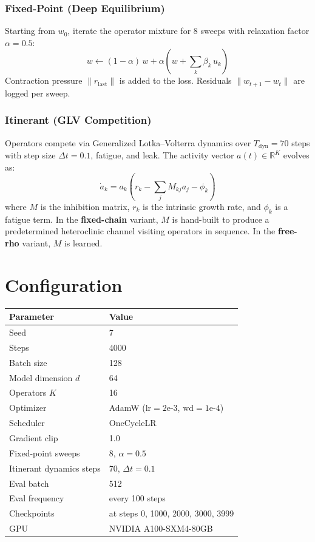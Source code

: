 \documentclass[11pt]{article}
\begin{document}
\subsubsection*{Fixed-Point (Deep Equilibrium)}
Starting from $w_0$, iterate the operator mixture for 8 sweeps with relaxation factor $\alpha = 0.5$:
\[
w \leftarrow (1 - \alpha) \, w + \alpha \left(w + \sum_k \beta_k \, u_k\right)
\]
Contraction pressure $\|r_{\text{last}}\|$ is added to the loss. Residuals $\|w_{t+1} - w_t\|$ are logged per sweep.

\subsubsection*{Itinerant (GLV Competition)}
Operators compete via Generalized Lotka--Volterra dynamics over $T_{\text{dyn}} = 70$ steps with step size $\Delta t = 0.1$, fatigue, and leak. The activity vector $a(t) \in \mathbb{R}^K$ evolves as:
\[
\dot{a}_k = a_k \left(r_k - \sum_j M_{kj} a_j - \phi_k\right)
\]
where $M$ is the inhibition matrix, $r_k$ is the intrinsic growth rate, and $\phi_k$ is a fatigue term. In the \textbf{fixed-chain} variant, $M$ is hand-built to produce a predetermined heteroclinic channel visiting operators in sequence. In the \textbf{free-rho} variant, $M$ is learned.

\section{Configuration}

\begin{table}[H]
\centering
\begin{tabular}{ll}
\toprule
\textbf{Parameter} & \textbf{Value} \\
\midrule
Seed & 7 \\
Steps & 4000 \\
Batch size & 128 \\
Model dimension $d$ & 64 \\
Operators $K$ & 16 \\
Optimizer & AdamW ($\text{lr}=2\text{e-}3$, $\text{wd}=1\text{e-}4$) \\
Scheduler & OneCycleLR \\
Gradient clip & 1.0 \\
Fixed-point sweeps & 8, $\alpha=0.5$ \\
Itinerant dynamics steps & 70, $\Delta t=0.1$ \\
Eval batch & 512 \\
Eval frequency & every 100 steps \\
Checkpoints & at steps 0, 1000, 2000, 3000, 3999 \\
GPU & NVIDIA A100-SXM4-80GB \\
\bottomrule
\end{tabular}
\end{table}
\end{document}

